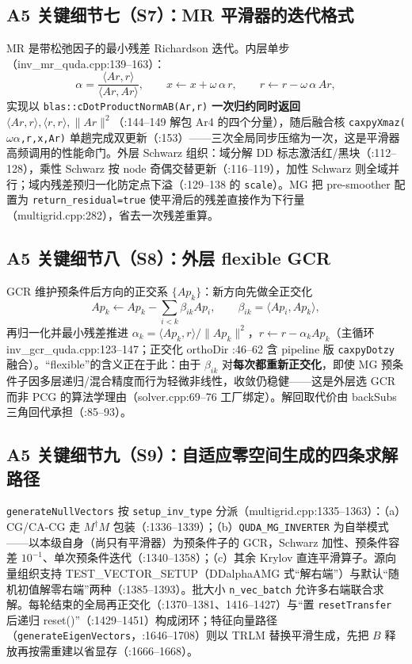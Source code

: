 \documentclass[UTF8]{ctexart}
\begin{document}
\subsection{A5 关键细节七（S7）：MR 平滑器的迭代格式}

MR 是带松弛因子的最小残差 Richardson 迭代。内层单步（inv\_mr\_quda.cpp:139--163）：
\begin{equation}
\alpha=\frac{\langle Ar,r\rangle}{\langle Ar,Ar\rangle},\qquad
x\leftarrow x+\omega\,\alpha\,r,\qquad
r\leftarrow r-\omega\,\alpha\,Ar,
\label{eq:mr}
\end{equation}
实现以 \texttt{blas::cDotProductNormAB(Ar,r)} \textbf{一次归约同时返回} $\langle Ar,r\rangle,\langle r,r\rangle,\|Ar\|^2$（:144--149 解包 Ar4 的四个分量），随后融合核 \texttt{caxpyXmaz($\omega\alpha$,r,x,Ar)} 单趟完成双更新（:153）——三次全局同步压缩为一次，这是平滑器高频调用的性能命门。外层 Schwarz 组织：域分解 DD 标志激活红/黑块（:112--128），乘性 Schwarz 按 node 奇偶交替更新（:116--119），加性 Schwarz 则全域并行；域内残差预归一化防定点下溢（:129--138 的 \texttt{scale}）。MG 把 pre-smoother 配置为 \texttt{return\_residual=true} 使平滑后的残差直接作为下行量（multigrid.cpp:282），省去一次残差重算。

\subsection{A5 关键细节八（S8）：外层 flexible GCR}

GCR 维护预条件后方向的正交系 $\{Ap_k\}$：新方向先做全正交化
\begin{equation}
Ap_k\leftarrow Ap_k-\sum_{i<k}\beta_{ik}Ap_i,\qquad\beta_{ik}=\langle Ap_i,Ap_k\rangle,
\label{eq:gcr}
\end{equation}
再归一化并最小残差推进 $\alpha_k=\langle Ap_k,r\rangle/\|Ap_k\|^2$，$r\leftarrow r-\alpha_k Ap_k$（主循环 inv\_gcr\_quda.cpp:123--147；正交化 orthoDir :46--62 含 pipeline 版 \texttt{caxpyDotzy} 融合）。``flexible''的含义正在于此：由于 $\beta_{ik}$ 对\textbf{每次都重新正交化}，即使 MG 预条件子因多层递归/混合精度而行为轻微非线性，收敛仍稳健——这是外层选 GCR 而非 PCG 的算法学理由（solver.cpp:69--76 工厂绑定）。解回取代价由 backSubs 三角回代承担（:85--93）。

\subsection{A5 关键细节九（S9）：自适应零空间生成的四条求解路径}

\texttt{generateNullVectors} 按 \texttt{setup\_inv\_type} 分派（multigrid.cpp:1335--1363）：（a）CG/CA-CG 走 $M^\dagger M$ 包装（:1336--1339）；（b）\texttt{QUDA\_MG\_INVERTER} 为自举模式——以本级自身（尚只有平滑器）为预条件子的 GCR，Schwarz 加性、预条件容差 $10^{-1}$、单次预条件迭代（:1340--1358）；（c）其余 Krylov 直连平滑算子。源向量组织支持 TEST\_VECTOR\_SETUP（DDalphaAMG 式``解右端''）与默认``随机初值解零右端''两种（:1385--1393）。批大小 \texttt{n\_vec\_batch} 允许多右端联合求解。每轮结束的全局再正交化（:1370--1381、1416--1427）与``置 \texttt{resetTransfer} 后递归 reset()''（:1429--1451）构成闭环；特征向量路径（\texttt{generateEigenVectors}，:1646--1708）则以 TRLM 替换平滑生成，先把 $B$ 释放再按需重建以省显存（:1666--1668）。
\end{document}
